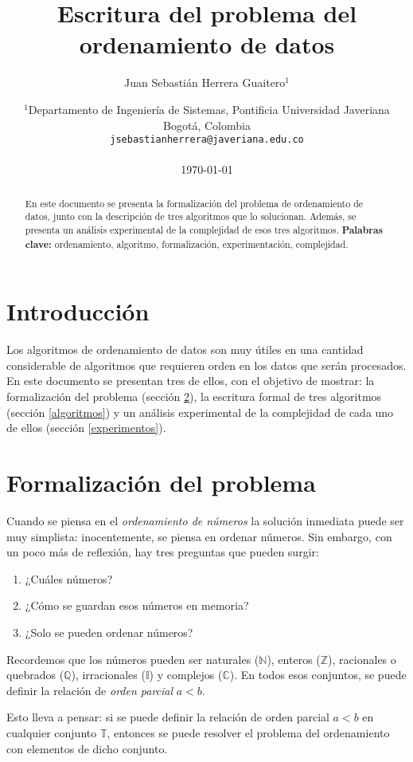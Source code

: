 \documentclass[]{article}
\title{Escritura del problema del ordenamiento de datos}
\author{Juan Sebastián Herrera Guaitero$^1$}
\date{
	$^1$Departamento de Ingeniería de Sistemas, Pontificia Universidad Javeriana\\Bogotá,  Colombia \\
	\texttt{jsebastianherrera@javeriana.edu.co}\\~\\
	\today
}
\begin{document}
\maketitle

\begin{abstract}
    En este documento se presenta la formalización del problema de ordenamiento de datos, junto con la descripción de tres algoritmos que lo solucionan. Además, se presenta un análisis experimental de la complejidad de esos tres algoritmos.
    \textbf{Palabras clave:} ordenamiento, algoritmo, formalización, experimentación, complejidad.
\end{abstract}

\tableofcontents
\newpage
\section{Introducción} \label{intro}
Los algoritmos de ordenamiento de datos son muy útiles en una cantidad considerable de algoritmos que requieren orden en los datos que serán procesados. En este documento se presentan tres de ellos, con el objetivo de mostrar: la formalización del problema (sección \ref{formalizacion}), la escritura formal de tres algoritmos (sección \ref{algoritmos}) y un análisis experimental de la complejidad de cada uno de ellos (sección \ref{experimentos}).

\section{Formalización del problema} \label{formalizacion}
Cuando se piensa en el {\it ordenamiento de números} la solución inmediata puede ser muy simplista: inocentemente, se piensa en ordenar números. Sin embargo, con un poco más de reflexión, hay tres preguntas que pueden surgir:
\begin{enumerate}
    \item ¿Cuáles números?
    \item ¿Cómo se guardan esos números en memoria?
    \item ¿Solo se pueden ordenar números?
\end{enumerate}

Recordemos que los números pueden ser naturales ($\mathbb{N}$), enteros ($\mathbb{Z}$), racionales o quebrados ($\mathbb{Q}$), irracionales ($\mathbb{I}$) y complejos ($\mathbb{C}$). En todos esos conjuntos, se puede definir la relación de {\it orden parcial} $a<b$.

Esto lleva a pensar: si se puede definir la relación de orden parcial $a<b$ en cualquier conjunto $\mathbb{T}$, entonces se puede resolver el problema del ordenamiento con elementos de dicho conjunto.
\end{document}
